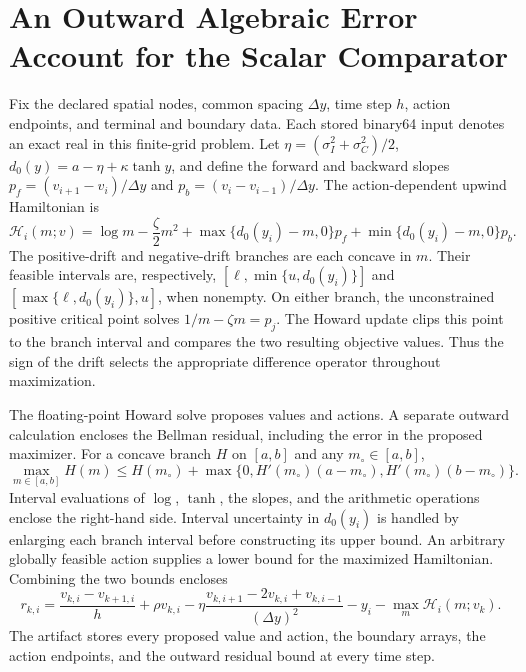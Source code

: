 \section{An Outward Algebraic Error Account for the Scalar Comparator}
\label{app:r15scalar}

Fix the declared spatial nodes, common spacing $\Delta y$, time step $h$,
action endpoints, and terminal and boundary data.  Each stored binary64 input
denotes an exact real in this finite-grid problem.  Let
$\eta=(\sigma_I^2+\sigma_C^2)/2$,
$d_0(y)=a-\eta+\kappa\tanh y$, and define the forward and backward slopes
$p_f=(v_{i+1}-v_i)/\Delta y$ and $p_b=(v_i-v_{i-1})/\Delta y$.
The action-dependent upwind Hamiltonian is
\begin{equation}
 \mathcal H_i(m;v)=\log m-\frac\zeta2m^2
        +\max\{d_0(y_i)-m,0\}p_f+\min\{d_0(y_i)-m,0\}p_b.
 \label{eq:r15-scalar-upwind-hamiltonian}
\end{equation}
The positive-drift and negative-drift branches are each concave in $m$.
Their feasible intervals are, respectively,
$[\ell,\min\{u,d_0(y_i)\}]$ and
$[\max\{\ell,d_0(y_i)\},u]$, when nonempty.  On either branch, the
unconstrained positive critical point solves $1/m-\zeta m=p_j$.
The Howard update clips this point to the branch interval and compares the
two resulting objective values.  Thus the sign of the drift selects the
appropriate difference operator throughout maximization.

The floating-point Howard solve proposes values and actions.  A separate
outward calculation encloses the Bellman residual, including the error in
the proposed maximizer.  For a concave branch $H$ on $[a,b]$ and any
$m_\circ\in[a,b]$,
\begin{equation}
 \max_{m\in[a,b]}H(m)
 \le H(m_\circ)+
 \max\{0,H'(m_\circ)(a-m_\circ),H'(m_\circ)(b-m_\circ)\}.
 \label{eq:r15-scalar-tangent-upper}
\end{equation}
Interval evaluations of $\log$, $\tanh$, the slopes, and the arithmetic
operations enclose the right-hand side.  Interval uncertainty in $d_0(y_i)$
is handled by enlarging each branch interval before constructing its upper
bound.  An arbitrary globally feasible action supplies a lower bound for
the maximized Hamiltonian.  Combining the two bounds encloses
\begin{equation}
 r_{k,i}=
 \frac{v_{k,i}-v_{k+1,i}}h+\rho v_{k,i}
 -\eta\frac{v_{k,i+1}-2v_{k,i}+v_{k,i-1}}{(\Delta y)^2}
 -y_i-\max_m\mathcal H_i(m;v_k).
 \label{eq:r15-scalar-discrete-residual}
\end{equation}
The artifact stores every proposed value and action, the boundary arrays,
the action endpoints, and the outward residual bound at every time step.

